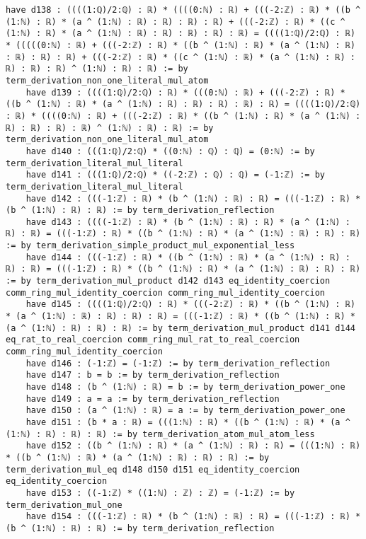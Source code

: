 \documentclass{article}
\begin{document}
\begin{tcolorbox}[colback=white!10, width=\linewidth]
\begin{lstlisting}[language=Lean4]
    have d138 : ((((1:ℚ)/2:ℚ) : ℝ) * ((((0:ℕ) : ℝ) + (((-2:ℤ) : ℝ) * ((b ^ (1:ℕ) : ℝ) * (a ^ (1:ℕ) : ℝ) : ℝ) : ℝ) : ℝ) + (((-2:ℤ) : ℝ) * ((c ^ (1:ℕ) : ℝ) * (a ^ (1:ℕ) : ℝ) : ℝ) : ℝ) : ℝ) : ℝ) = ((((1:ℚ)/2:ℚ) : ℝ) * (((((0:ℕ) : ℝ) + (((-2:ℤ) : ℝ) * ((b ^ (1:ℕ) : ℝ) * (a ^ (1:ℕ) : ℝ) : ℝ) : ℝ) : ℝ) + (((-2:ℤ) : ℝ) * ((c ^ (1:ℕ) : ℝ) * (a ^ (1:ℕ) : ℝ) : ℝ) : ℝ) : ℝ) ^ (1:ℕ) : ℝ) : ℝ) := by term_derivation_non_one_literal_mul_atom
    have d139 : ((((1:ℚ)/2:ℚ) : ℝ) * (((0:ℕ) : ℝ) + (((-2:ℤ) : ℝ) * ((b ^ (1:ℕ) : ℝ) * (a ^ (1:ℕ) : ℝ) : ℝ) : ℝ) : ℝ) : ℝ) = ((((1:ℚ)/2:ℚ) : ℝ) * ((((0:ℕ) : ℝ) + (((-2:ℤ) : ℝ) * ((b ^ (1:ℕ) : ℝ) * (a ^ (1:ℕ) : ℝ) : ℝ) : ℝ) : ℝ) ^ (1:ℕ) : ℝ) : ℝ) := by term_derivation_non_one_literal_mul_atom
    have d140 : (((1:ℚ)/2:ℚ) * ((0:ℕ) : ℚ) : ℚ) = (0:ℕ) := by term_derivation_literal_mul_literal
    have d141 : (((1:ℚ)/2:ℚ) * ((-2:ℤ) : ℚ) : ℚ) = (-1:ℤ) := by term_derivation_literal_mul_literal
    have d142 : (((-1:ℤ) : ℝ) * (b ^ (1:ℕ) : ℝ) : ℝ) = (((-1:ℤ) : ℝ) * (b ^ (1:ℕ) : ℝ) : ℝ) := by term_derivation_reflection
    have d143 : ((((-1:ℤ) : ℝ) * (b ^ (1:ℕ) : ℝ) : ℝ) * (a ^ (1:ℕ) : ℝ) : ℝ) = (((-1:ℤ) : ℝ) * ((b ^ (1:ℕ) : ℝ) * (a ^ (1:ℕ) : ℝ) : ℝ) : ℝ) := by term_derivation_simple_product_mul_exponential_less
    have d144 : (((-1:ℤ) : ℝ) * ((b ^ (1:ℕ) : ℝ) * (a ^ (1:ℕ) : ℝ) : ℝ) : ℝ) = (((-1:ℤ) : ℝ) * ((b ^ (1:ℕ) : ℝ) * (a ^ (1:ℕ) : ℝ) : ℝ) : ℝ) := by term_derivation_mul_product d142 d143 eq_identity_coercion comm_ring_mul_identity_coercion comm_ring_mul_identity_coercion
    have d145 : ((((1:ℚ)/2:ℚ) : ℝ) * (((-2:ℤ) : ℝ) * ((b ^ (1:ℕ) : ℝ) * (a ^ (1:ℕ) : ℝ) : ℝ) : ℝ) : ℝ) = (((-1:ℤ) : ℝ) * ((b ^ (1:ℕ) : ℝ) * (a ^ (1:ℕ) : ℝ) : ℝ) : ℝ) := by term_derivation_mul_product d141 d144 eq_rat_to_real_coercion comm_ring_mul_rat_to_real_coercion comm_ring_mul_identity_coercion
    have d146 : (-1:ℤ) = (-1:ℤ) := by term_derivation_reflection
    have d147 : b = b := by term_derivation_reflection
    have d148 : (b ^ (1:ℕ) : ℝ) = b := by term_derivation_power_one
    have d149 : a = a := by term_derivation_reflection
    have d150 : (a ^ (1:ℕ) : ℝ) = a := by term_derivation_power_one
    have d151 : (b * a : ℝ) = (((1:ℕ) : ℝ) * ((b ^ (1:ℕ) : ℝ) * (a ^ (1:ℕ) : ℝ) : ℝ) : ℝ) := by term_derivation_atom_mul_atom_less
    have d152 : ((b ^ (1:ℕ) : ℝ) * (a ^ (1:ℕ) : ℝ) : ℝ) = (((1:ℕ) : ℝ) * ((b ^ (1:ℕ) : ℝ) * (a ^ (1:ℕ) : ℝ) : ℝ) : ℝ) := by term_derivation_mul_eq d148 d150 d151 eq_identity_coercion eq_identity_coercion
    have d153 : ((-1:ℤ) * ((1:ℕ) : ℤ) : ℤ) = (-1:ℤ) := by term_derivation_mul_one
    have d154 : (((-1:ℤ) : ℝ) * (b ^ (1:ℕ) : ℝ) : ℝ) = (((-1:ℤ) : ℝ) * (b ^ (1:ℕ) : ℝ) : ℝ) := by term_derivation_reflection

\end{lstlisting}
\end{tcolorbox}
\end{document}
